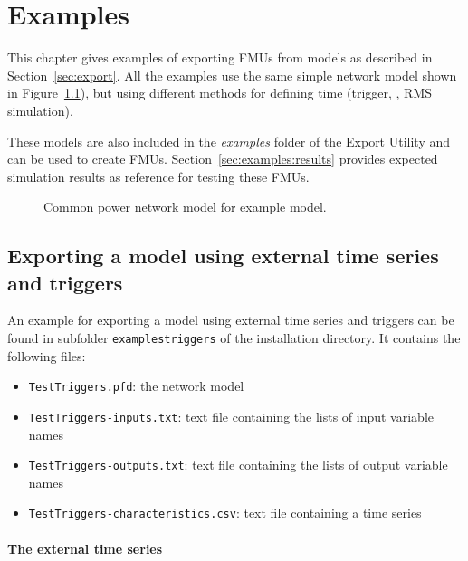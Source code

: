 
\chapter{Examples}
\label{sec:examples}

This chapter gives examples of exporting FMUs from \pf models as described in Section~\ref{sec:export}.
All the examples use the same simple network model shown in Figure~\ref{fig:test_model}), but using different methods for defining time (trigger, \dplscript, RMS simulation).

These models are also included in the \emph{examples} folder of the \fmipp \pf Export Utility and can be used to create FMUs.
Section~\ref{sec:examples:results} provides expected simulation results as reference for testing these FMUs.

\begin{figure}[h!]
\vspace*{1em}
\caption{Common power network model for example model.}
\label{fig:test_model}
\end{figure}


\section{Exporting a model using external time series and triggers}
\label{sec:examples:triggers}

An example for exporting a model using external time series and triggers can be found in subfolder \texttt{examplestriggers} of the installation directory.
It contains the following files:
\begin{itemize}
  \item \texttt{TestTriggers.pfd}: the \pf network model
  \item \texttt{TestTriggers-inputs.txt}: text file containing the lists of input variable names
  \item \texttt{TestTriggers-outputs.txt}: text file containing the lists of output variable names
  \item \texttt{TestTriggers-characteristics.csv}: text file containing a time series
\end{itemize}

\subsubsection*{The external time series}

